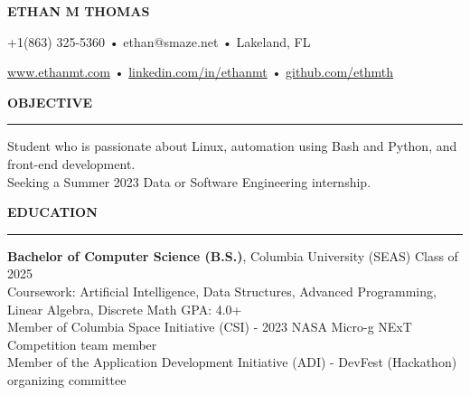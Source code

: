 \documentclass[10pt,letterpaper]{article}
\begin{document}
\begingroup
\centerline{\MakeUppercase{\LARGE\bf Ethan M Thomas}} \medskip
\endgroup

\begingroup
\centerline{+1(863) 325-5360 • ethan@smaze.net • Lakeland, FL}
\endgroup
\par

\begingroup
\centerline{\href{www.ethanmt.com}{www.ethanmt.com} • \href{https://www.linkedin.com/in/ethanmt/}{linkedin.com/in/ethanmt} • \href{https://github.com/ethmth}{github.com/ethmth}}
\endgroup
\par


\medskip
\MakeUppercase{{\bf Objective}} %
\medskip
\hrule %
\begin{list}{}{\setlength{\leftmargin}{0em}}
    \item
          {Student who is passionate about Linux, automation using Bash and Python, and front-end development.
          \\ Seeking a Summer 2023 Data or Software Engineering internship.}
\end{list}



\medskip
\MakeUppercase{{\bf Education}}
\medskip
\hrule
\begin{list}{}{\setlength{\leftmargin}{0em}}
    \item
          {\bf Bachelor of Computer Science (B.S.)}, Columbia University (SEAS) \hfill  {Class of 2025}\\
          Coursework: Artificial Intelligence, Data Structures, Advanced Programming, Linear Algebra, Discrete Math \hfill {GPA: 4.0+}
          \medskip
          \\
          Member of Columbia Space Initiative (CSI) - 2023 NASA Micro-g NExT Competition team member \\
          Member of the Application Development Initiative (ADI) - DevFest (Hackathon) organizing committee
\end{list}
\end{document}
